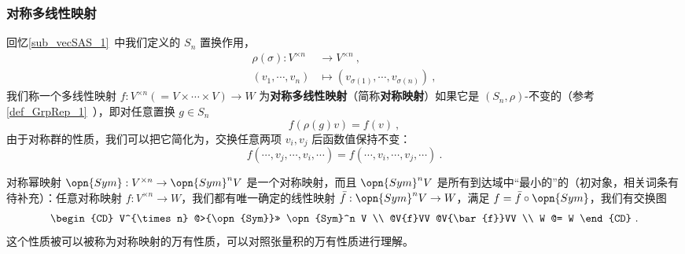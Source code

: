
\subsubsection{对称多线性映射}

回忆\autoref{sub_vecSAS_1}~中我们定义的 $S_n$ 置换作用，
\begin{equation}
\begin{aligned}
\rho(\sigma): V^{\times n} &\to V^{\times n}~, \\
(v_1, \cdots, v_n) &\mapsto (v_{\sigma(1)}, \cdots, v_{\sigma(n)})~,
\end{aligned}
\end{equation}
我们称一个多线性映射 $f: V^{\times n} (= V \times \cdots \times V) \to W$ 为\textbf{对称多线性映射}（简称\textbf{对称映射}）如果它是 $(S_n, \rho)$-不变的（参考\autoref{def_GrpRep_1}~），即对任意置换 $g \in S_n$
\begin{equation}
f(\rho(g) v) = f(v)~,
\end{equation}
由于对称群的性质，我们可以把它简化为，交换任意两项 $v_i, v_j$ 后函数值保持不变：
\begin{equation}
f(\cdots, v_j, \cdots, v_i, \cdots) = f(\cdots, v_i, \cdots, v_j, \cdots)~.
\end{equation}


对称幂映射 $\opn{Sym}: V^{\times n} \to \opn{Sym}^n V$ 是一个对称映射，而且 $\opn{Sym}^n V$ 是所有到达域中“最小的”的（初对象，相关词条有待补充）：任意对称映射 $f: V^{\times n} \to W$，我们都有唯一确定的线性映射 $\bar{f}: \opn{Sym}^n V \to W$，满足 $f = \bar{f} \circ \opn{Sym}$，我们有交换图
\begin{equation}
\begin{CD}
V^{\times n} @>{\opn{Sym}}>> \opn{Sym}^n V \\
@V{f}VV @V{\bar{f}}VV \\
W @= W
\end{CD}~.
\end{equation}
这个性质被可以被称为对称映射的万有性质，可以对照张量积的万有性质进行理解。


